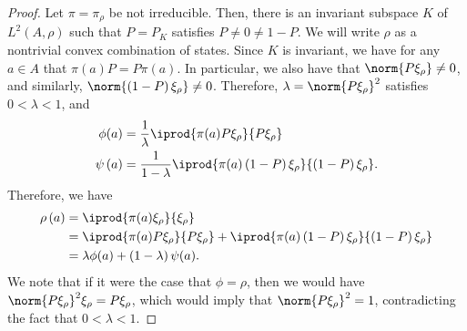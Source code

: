 \documentclass[10pt]{mypackage}
\begin{document}
\begin{proof}
  Let $\pi = \pi_{\rho}$ be not irreducible. Then, there is an invariant subspace $K$ of $L^2\left( A,\rho \right)$ such that $P = P_K$ satisfies $P\neq 0 \neq 1-P$. We will write $\rho$ as a nontrivial convex combination of states. Since $K$ is invariant, we have for any $a\in A$ that $\pi(a)P = P\pi(a)$. In particular, we also have that $\norm{P\xi_{\rho}}\neq 0$, and similarly, $\norm{\left( 1-P \right)\xi_{\rho}}\neq 0$. Therefore, $\lambda = \norm{P\xi_{\rho}}^2$ satisfies $0 < \lambda < 1$, and
  \begin{align*}
    \phi(a) &= \frac{1}{\lambda} \iprod{\pi(a)P\xi_{\rho}}{P\xi_{\rho}}\\
    \psi\left( a \right) &= \frac{1}{1-\lambda} \iprod{\pi(a)\left( 1-P \right)\xi_{\rho}}{\left( 1-P \right)\xi_{\rho}}.
  \end{align*}
  Therefore, we have 
  \begin{align*}
    \rho\left( a \right) &= \iprod{\pi(a)\xi_{\rho}}{\xi_{\rho}}\\
                         &= \iprod{\pi(a)P\xi_{\rho}}{P\xi_{\rho}} + \iprod{\pi(a)\left( 1-P \right)\xi_{\rho}}{\left( 1-P \right)\xi_{\rho}}\\
                         &= \lambda\phi(a) + \left( 1-\lambda \right)\psi(a).
  \end{align*}
  We note that if it were the case that $\phi = \rho$, then we would have $\norm{P\xi_{\rho}}^2\xi_{\rho} = P\xi_{\rho}$, which would imply that $\norm{P\xi_{\rho}}^2 = 1$, contradicting the fact that $0 < \lambda < 1$.
  

\end{proof}
\end{document}
